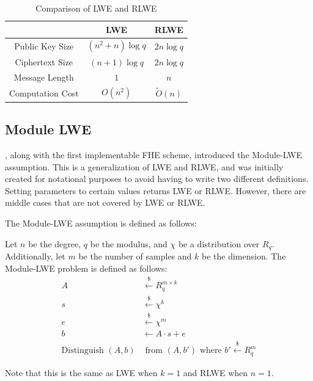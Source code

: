 \documentclass[12pt]{tufte-book}
\newcommand{\getsr}{\xleftarrow{\$}}
\begin{document}
\begin{table}[!htbp]
    \centering
    \begin{tabular}{|c|c|c|}
        \hline
        & LWE & RLWE \\
        \hline
        Public Key Size & $(n^2 + n) \log q$ & $2n \log q$ \\
        \hline
        Ciphertext Size & $(n+1) \log q$ & $2n \log q$ \\
        \hline
        Message Length & $1$ & $n$ \\
        \hline
        Computation Cost & $O(n^2)$ & $\tilde{O}(n)$ \\
        \hline
    \end{tabular}
    \caption{Comparison of LWE and RLWE}
\end{table}

\subsection{Module LWE}
\cite{ITCS:BraGenVai12}, along with the first implementable FHE scheme, introduced the Module-LWE assumption. This is a generalization of LWE and RLWE, and was initially created for notational purposes to avoid having to write two different definitions. Setting parameters to certain values returns LWE or RLWE. However, there are middle cases that are not covered by LWE or RLWE. 

The Module-LWE assumption is defined as follows:
\begin{definition}
    Let $n$ be the degree, $q$ be the modulus, and $\chi$ be a distribution over $R_q$. Additionally, let $m$ be the number of samples and $k$ be the dimension.
    The Module-LWE problem is defined as follows: 
    \begin{align*}
        A &\getsr R_q^{m \times k} \\
        s &\getsr \chi^k \\
        e &\getsr \chi^m \\
        b &\gets A \cdot s + e \\
        \text{Distinguish } (A,b) &\text{ from } (A,b') \text{ where } b' \getsr R_q^m
    \end{align*}
\end{definition}

Note that this is the same as LWE when $k = 1$ and RLWE when $n = 1$. 
\end{document}
